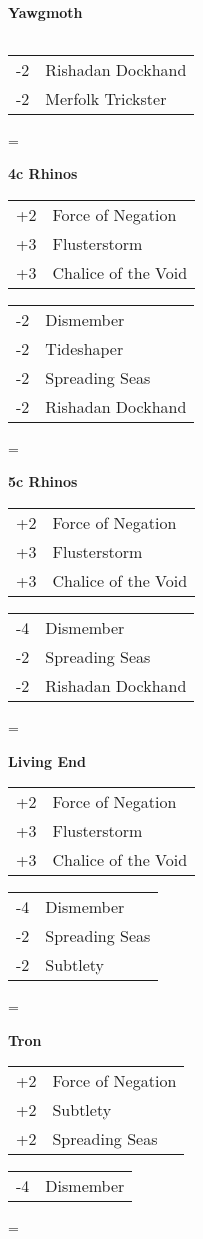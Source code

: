 \documentclass[fontsize=12pt,paper=a4]{scrartcl}
\newenvironment{absolutelynopagebreak}
  {\par\nobreak\vfil\penalty0\vfilneg
   \vtop\bgroup}
  {\par\xdef\tpd{\the\prevdepth}\egroup
   \prevdepth=\tpd}
\newenvironment{decklist}{%
    \begin{tabular}{>{\hspace{-4pt}}r<{\hspace{-3pt}}>{\hspace{-3pt}}l<{\hspace{-4pt}}}
    }{%
    \end{tabular}
    \par
}
\newcommand{\card}[2]{#1 & #2\\}
\newenvironment{sideboardguide}{%
    \newpage
    \begin{multicols}{4}
        \begin{small}
        }{%
        \end{small}
    \end{multicols}
}
\newenvironment{matchup}[1]{%
    \begin{absolutelynopagebreak}
        \textbf{#1}\par
    }{%
    \end{absolutelynopagebreak}
    \par\vspace{2em}
}
\begin{document}
\begin{sideboardguide}
\begin{matchup}{Yawgmoth}
\begin{decklist}
        \end{decklist}
        \begin{decklist}
            \card{-2}{Rishadan Dockhand}
            \card{-2}{Merfolk Trickster}
        \end{decklist}
    \end{matchup}
    \begin{matchup}{4c Rhinos}
        \begin{decklist}
            \card{+2}{Force of Negation}
            \card{+3}{Flusterstorm}
            \card{+3}{Chalice of the Void}
        \end{decklist}
        \begin{decklist}
            \card{-2}{Dismember}
            \card{-2}{Tideshaper}
            \card{-2}{Spreading Seas}
            \card{-2}{Rishadan Dockhand}
        \end{decklist}
    \end{matchup}
    \begin{matchup}{5c Rhinos}
        \begin{decklist}
            \card{+2}{Force of Negation}
            \card{+3}{Flusterstorm}
            \card{+3}{Chalice of the Void}
        \end{decklist}
        \begin{decklist}
            \card{-4}{Dismember}
            \card{-2}{Spreading Seas}
            \card{-2}{Rishadan Dockhand}
        \end{decklist}
    \end{matchup}
    \begin{matchup}{Living End}
        \begin{decklist}
            \card{+2}{Force of Negation}
            \card{+3}{Flusterstorm}
            \card{+3}{Chalice of the Void}
        \end{decklist}
        \begin{decklist}
            \card{-4}{Dismember}
            \card{-2}{Spreading Seas}
            \card{-2}{Subtlety}
        \end{decklist}
    \end{matchup}
    \begin{matchup}{Tron}
        \begin{decklist}
            \card{+2}{Force of Negation}
            \card{+2}{Subtlety}
            \card{+2}{Spreading Seas}
        \end{decklist}
        \begin{decklist}
            \card{-4}{Dismember}

\end{decklist}
\end{matchup}
\end{sideboardguide}
\end{document}
